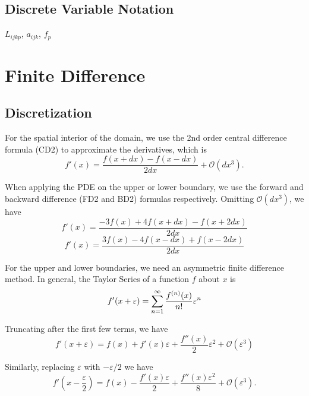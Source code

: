 \subsection{Discrete Variable Notation}

$L_{ijkp}$, $a_{ijk}$, $f_p$

\section{Finite Difference}

\subsection{Discretization}

For the spatial interior of the domain, we use the 2nd order central difference formula (CD2) to approximate the derivatives, which is
\begin{equation}
    \tag{CD2}
    f'(x) = \frac{f(x+dx)-f(x-dx)}{2dx} + \mathcal{O}(dx^3).
\end{equation}

When applying the PDE on the upper or lower boundary, we use the forward and backward difference (FD2 and BD2) formulas respectively.
Omitting $\mathcal{O}(dx^3)$, we have
\begin{equation}
    \tag{FD2}
    \label{eq:FD2}
    f'(x) = \frac{-3f(x)+4f(x+dx)-f(x+2dx)}{2dx}
\end{equation}
\begin{equation}
    \tag{BD2}
    \label{eq:BD2}
    f'(x) = \frac{3f(x)-4f(x-dx)+f(x-2dx)}{2dx}
\end{equation}

For the upper and lower boundaries, we need an asymmetric finite difference
method.
In general, the Taylor Series of a function $f$ about $x$ is
\begin{equation}
  f'(x+\varepsilon) = \sum_{n=1}^\infty \frac{f^{(n)}(x)}{n!} \varepsilon^n \\
\end{equation}

Truncating after the first few terms, we have
\begin{equation}
  \label{eqn:afd1}
  f'(x+\varepsilon)  = f(x) + f'(x)\varepsilon + \frac{f''(x)}{2}\varepsilon^2 + \mathcal{O}(\varepsilon^3)
\end{equation}

Similarly, replacing $\varepsilon$ with $-\varepsilon/2$ we have
\begin{equation}
  \label{eqn:afd2}
  f'(x-\frac{\varepsilon}{2}) = f(x) - \frac{f'(x)\varepsilon}{2} + \frac{f''(x)\varepsilon^2}{8} + \mathcal{O}(\varepsilon^3).
\end{equation}

